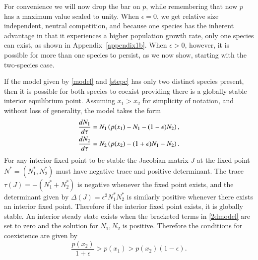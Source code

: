 For convenience we will now drop the bar on $p$, while remembering that now $p$ has a maximum value scaled to unity. When $\epsilon=0$, we get relative size independent, neutral competition, and because one species has the inherent advantage in that it experiences a higher population growth rate, only one species can exist, as shown in Appendix~\ref{appendix1b}.
When $\epsilon>0$, however, it is possible for more than one species to persist, as we now show, starting with the two-species case.

If the model given by \eqref{model} and \eqref{stepc} has only two distinct species present, then it is possible for both species to coexist providing there is a globally stable interior equilibrium point. Assuming $x_1>x_2$ for simplicity of notation, and without loss of generality, the model takes the form
\begin{align}
\label{2dmodel}
\frac{d N_{1}}{d\tau}&=N_{1}\left(p(x_1)-N_{1}-(1-\epsilon)N_{2}\right), \notag \\
\frac{d N_{2}}{d\tau}&=N_{2} \left(p(x_2)-(1+\epsilon)N_{1}-N_{2}\right).
\end{align}
For any interior fixed point to be stable the Jacobian matrix $J$ at the fixed point $N^*=(N_{1}^*,N_{2}^*)$ must have negative trace and positive determinant. The trace $\tau(J)=-(N_{1}^*+N_{2}^*)$ is negative whenever the fixed point exists, and the determinant given by $\Delta(J)=\epsilon^2 N_{1}^* N_{2}^*$ is similarly positive whenever there exists an interior fixed point. Therefore if the interior fixed point exists, it is globally stable. An interior steady state exists when the bracketed terms in \eqref{2dmodel} are set to zero and the solution for $N_{1},N_{2}$ is positive. Therefore the conditions for coexistence are given by
\begin{equation}
\label{2dcond}
\frac{p(x_2)}{1+\epsilon}>p(x_1)>p(x_2)(1-\epsilon).
\end{equation}

